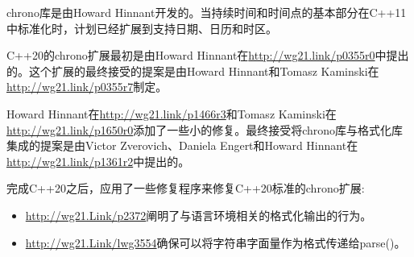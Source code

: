 chrono库是由Howard Hinnant开发的。当持续时间和时间点的基本部分在C++11中标准化时，计划已经扩展到支持日期、日历和时区。

C++20的chrono扩展最初是由Howard Hinnant在\url{http://wg21.link/p0355r0}中提出的。这个扩展的最终接受的提案是由Howard Hinnant和Tomasz Kaminski在\url{http://wg21.link/p0355r7}制定。

Howard Hinnant在\url{http://wg21.link/p1466r3}和Tomasz Kaminski在\url{http://wg21.link/p1650r0}添加了一些小的修复。最终接受将chrono库与格式化库集成的提案是由Victor Zverovich、Daniela Engert和Howard Hinnant在\url{http://wg21.link/p1361r2}中提出的。

完成C++20之后，应用了一些修复程序来修复C++20标准的chrono扩展:

\begin{itemize}
\item 
\url{http://wg21.Link/p2372}阐明了与语言环境相关的格式化输出的行为。

\item 
\url{http://wg21.Link/lwg3554}确保可以将字符串字面量作为格式传递给parse()。
\end{itemize}
